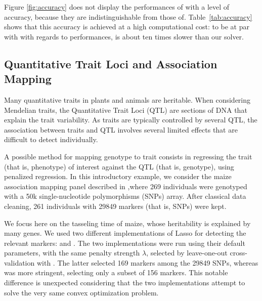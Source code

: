 \sloppypar
Figure \ref{fig:accuracy} does not display the performances of  with a  level of  accuracy, because they are indistinguishable from those of. Table~\ref{tab:accuracy} shows that this accuracy is achieved at 
a high computational cost: to be at par with  with regards to performances,  is about ten times slower than our solver.

\subsection{Quantitative Trait Loci and Association Mapping}

Many quantitative traits in plants and animals are heritable.  When
considering Mendelian traits, the Quantitative Trait Loci (QTL) are sections of
DNA that explain the trait variability.
As traits are typically controlled by several QTL, the association 
between traits and QTL involves several limited effects that are difficult to detect individually.

A possible method for mapping genotype to trait consists in regressing
the trait (that is, phenotype) of interest  against the QTL (that is, genotype), using penalized regression.
%
In this introductory example, we consider the maize association
mapping panel described in \citep{RincentEtAl2014},where 269
individuals were genotyped with a 50k single-nucleotide polymorphisms (SNPs) array. 
After classical data
cleaning, 261 individuals with 29849 markers (that is, SNPs) were kept.
%

We focus here on the tasseling time of maize, whose heritability is
explained by many genes.  We used two different implementations of
Lasso for detecting the relevant markers:  and
. The two implementations were run using their
default parameters, with the same penalty strength $\lambda$, selected
by leave-one-out cross-validation with .  The latter
selected 169 markers among the 29849 SNPs, whereas
 was more stringent, selecting only a subset of
156 markers.
This notable difference is unexpected considering that the two implementations attempt to solve the very same convex optimization problem.

